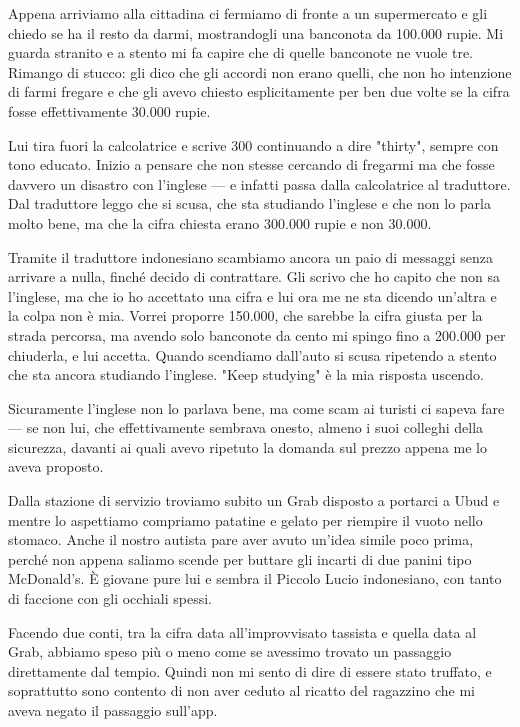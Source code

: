 Appena arriviamo alla cittadina ci fermiamo di fronte a un supermercato e gli chiedo se ha il resto da darmi, mostrandogli una banconota da 100.000 rupie. Mi guarda stranito e a stento mi fa capire che di quelle banconote ne vuole tre. Rimango di stucco: gli dico che gli accordi non erano quelli, che non ho intenzione di farmi fregare e che gli avevo chiesto esplicitamente per ben due volte se la cifra fosse effettivamente 30.000 rupie.

Lui tira fuori la calcolatrice e scrive 300 continuando a dire "thirty", sempre con tono educato. Inizio a pensare che non stesse cercando di fregarmi ma che fosse davvero un disastro con l'inglese — e infatti passa dalla calcolatrice al traduttore. Dal traduttore leggo che si scusa, che sta studiando l'inglese e che non lo parla molto bene, ma che la cifra chiesta erano 300.000 rupie e non 30.000.

Tramite il traduttore indonesiano scambiamo ancora un paio di messaggi senza arrivare a nulla, finché decido di contrattare. Gli scrivo che ho capito che non sa l'inglese, ma che io ho accettato una cifra e lui ora me ne sta dicendo un'altra e la colpa non è mia. Vorrei proporre 150.000, che sarebbe la cifra giusta per la strada percorsa, ma avendo solo banconote da cento mi spingo fino a 200.000 per chiuderla, e lui accetta. Quando scendiamo dall'auto si scusa ripetendo a stento che sta ancora studiando l'inglese. "Keep studying" è la mia risposta uscendo.

Sicuramente l'inglese non lo parlava bene, ma come scam ai turisti ci sapeva fare — se non lui, che effettivamente sembrava onesto, almeno i suoi colleghi della sicurezza, davanti ai quali avevo ripetuto la domanda sul prezzo appena me lo aveva proposto.

Dalla stazione di servizio troviamo subito un Grab disposto a portarci a Ubud e mentre lo aspettiamo compriamo patatine e gelato per riempire il vuoto nello stomaco. Anche il nostro autista pare aver avuto un'idea simile poco prima, perché non appena saliamo scende per buttare gli incarti di due panini tipo McDonald's. È giovane pure lui e sembra il Piccolo Lucio indonesiano, con tanto di faccione con gli occhiali spessi.

Facendo due conti, tra la cifra data all'improvvisato tassista e quella data al Grab, abbiamo speso più o meno come se avessimo trovato un passaggio direttamente dal tempio. Quindi non mi sento di dire di essere stato truffato, e soprattutto sono contento di non aver ceduto al ricatto del ragazzino che mi aveva negato il passaggio sull'app.

